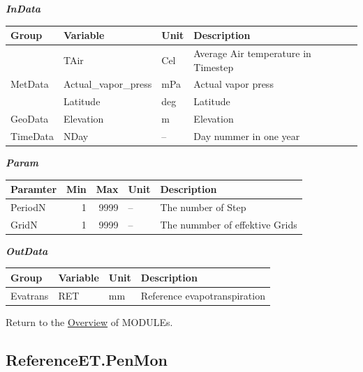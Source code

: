 \documentclass[
]{book}
\begin{document}
\textbf{\emph{InData}}

\begin{table}[!h]
\centering
\begin{tabular}{l|l|l|l}
\hline
Group & Variable & Unit & Description\\
\hline
 & TAir & Cel & Average Air temperature in Timestep\\
\cline{2-4}
\multirow{-2}{*}{\raggedright\arraybackslash MetData} & Actual\_vapor\_press & mPa & Actual vapor press\\
\cline{1-4}
 & Latitude & deg & Latitude\\
\cline{2-4}
\multirow{-2}{*}{\raggedright\arraybackslash GeoData} & Elevation & m & Elevation\\
\cline{1-4}
TimeData & NDay & -- & Day nummer in one year\\
\hline
\end{tabular}
\end{table}

\textbf{\emph{Param}}

\begin{table}[!h]
\centering
\begin{tabular}{l|r|r|l|l}
\hline
Paramter & Min & Max & Unit & Description\\
\hline
PeriodN & 1 & 9999 & -- & The number of Step\\
\cline{1-5}
GridN & 1 & 9999 & -- & The nummber of effektive Grids\\
\hline
\end{tabular}
\end{table}

\textbf{\emph{OutData}}

\begin{table}[!h]
\centering
\begin{tabular}{l|l|l|l}
\hline
Group & Variable & Unit & Description\\
\hline
Evatrans & RET & mm & Reference evapotranspiration\\
\hline
\end{tabular}
\end{table}

Return to the \protect\hyperlink{module}{Overview} of MODULEs.

\hypertarget{ReferenceET.PenMon}{%
\subsection{ReferenceET.PenMon}\label{ReferenceET.PenMon}}
\end{document}
